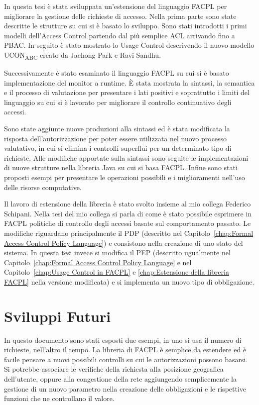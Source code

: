 \label{chap:Conclusioni}
In questa tesi è stata sviluppata un'estensione del linguaggio \ac{FACPL} per migliorare la gestione delle richieste di accesso.
Nella prima parte sono state descritte le strutture su cui si è basato lo sviluppo. Sono stati introdotti i primi modelli
dell'Access Control partendo dal più semplice \ac{ACL} arrivando fino a \ac{PBAC}. In seguito è stato mostrato lo Usage Control
descrivendo il nuovo modello UCON\textsubscript{ABC} creato da Jaehong Park e Ravi Sandhu.

Successivamente è stato esaminato il linguaggio \ac{FACPL} su cui si è basato implementazione del monitor a runtime.
\MakeUppercase{è} stata mostrata la sintassi, la semantica e il processo di valutazione per presentare i lati positivi
e soprattutto i limiti del linguaggio su cui si è lavorato per migliorare il controllo continuativo degli accessi.

Sono state aggiunte nuove produzioni alla sintassi ed è stata modificata la risposta dell'autorizzazione per poter
essere utilizzata nel nuovo processo valutativo, in cui si elimina i controlli superflui per un determinato tipo di richieste.
Alle modifiche apportate sulla sintassi sono seguite le implementazioni di nuove strutture nella libreria Java su cui si
basa \ac{FACPL}. Infine sono stati proposti esempi per presentare le operazioni possibili e i miglioramenti nell'uso delle
risorse computative.

Il lavoro di estensione della libreria è stato svolto insieme al mio collega Federico Schipani. Nella tesi del
mio collega si parla di come è stato possibile esprimere in FACPL politiche di controllo degli accessi basate
sul comportamento passato. Le modifiche riguardano principalmente il \ac{PDP} (descritto nel Capitolo~\ref{chap:Formal Access Control Policy Language})
e consistono nella creazione di uno stato del sistema. In questa tesi invece si modifica il \ac{PEP}
(descritto ugualmente nel Capitolo~\ref{chap:Formal Access Control Policy Language}
e nel Capitolo~\ref{chap:Usage Control in FACPL} e \ref{chap:Estensione della libreria FACPL} nella versione modificata)
e si implementa un nuovo tipo di obbligazione.
\section{Sviluppi Futuri}
\label{sec:Sviluppi Futuri}
In questo documento sono stati esposti due esempi, in uno si usa il numero di richieste, nell'altro il tempo.
La libreria di \ac{FACPL} è semplice da estendere ed è facile pensare a nuovi possibili controlli su cui
le autorizzazioni possono basarsi. Si potrebbe associare le verifiche della richiesta alla posizione
geografica dell'utente, oppure alla congestione della rete aggiungendo semplicemente la gestione di un nuovo parametro nella
creazione delle obbligazioni e le rispettive funzioni che ne controllano il valore.
